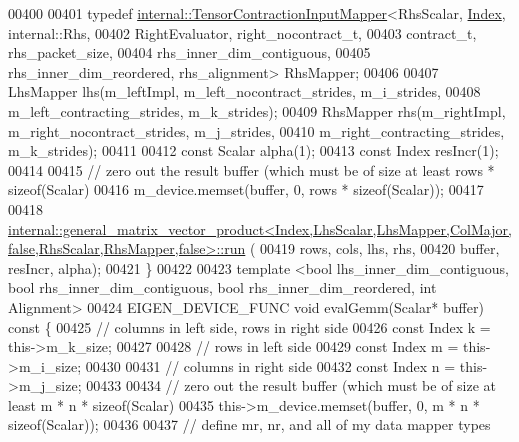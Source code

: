 \begin{DoxyCode}
00400 
00401     \textcolor{keyword}{typedef} \hyperlink{class_eigen_1_1internal_1_1_tensor_contraction_input_mapper}{internal::TensorContractionInputMapper}<RhsScalar, 
      \hyperlink{namespace_eigen_a62e77e0933482dafde8fe197d9a2cfde}{Index}, internal::Rhs,
00402                                                    RightEvaluator, right\_nocontract\_t,
00403                                                    contract\_t, rhs\_packet\_size,
00404                                                    rhs\_inner\_dim\_contiguous,
00405                                                    rhs\_inner\_dim\_reordered, rhs\_alignment> RhsMapper;
00406 
00407     LhsMapper lhs(m\_leftImpl, m\_left\_nocontract\_strides, m\_i\_strides,
00408                   m\_left\_contracting\_strides, m\_k\_strides);
00409     RhsMapper rhs(m\_rightImpl, m\_right\_nocontract\_strides, m\_j\_strides,
00410                   m\_right\_contracting\_strides, m\_k\_strides);
00411 
00412     \textcolor{keyword}{const} Scalar alpha(1);
00413     \textcolor{keyword}{const} Index resIncr(1);
00414 
00415     \textcolor{comment}{// zero out the result buffer (which must be of size at least rows * sizeof(Scalar)}
00416     m\_device.memset(buffer, 0, rows * \textcolor{keyword}{sizeof}(Scalar));
00417 
00418     
      \hyperlink{struct_eigen_1_1internal_1_1general__matrix__vector__product}{
      internal::general\_matrix\_vector\_product<Index,LhsScalar,LhsMapper,ColMajor,false,RhsScalar,RhsMapper,false>::run}
      (
00419         rows, cols, lhs, rhs,
00420         buffer, resIncr, alpha);
00421   \}
00422 
00423   \textcolor{keyword}{template} <\textcolor{keywordtype}{bool} lhs\_inner\_dim\_contiguous, \textcolor{keywordtype}{bool} rhs\_inner\_dim\_contiguous, \textcolor{keywordtype}{bool} rhs\_inner\_dim\_reordered, \textcolor{keywordtype}{int}
       Alignment>
00424   EIGEN\_DEVICE\_FUNC \textcolor{keywordtype}{void} evalGemm(Scalar* buffer)\textcolor{keyword}{ const }\{
00425     \textcolor{comment}{// columns in left side, rows in right side}
00426     \textcolor{keyword}{const} Index k = this->m\_k\_size;
00427 
00428     \textcolor{comment}{// rows in left side}
00429     \textcolor{keyword}{const} Index m = this->m\_i\_size;
00430 
00431     \textcolor{comment}{// columns in right side}
00432     \textcolor{keyword}{const} Index n = this->m\_j\_size;
00433 
00434     \textcolor{comment}{// zero out the result buffer (which must be of size at least m * n * sizeof(Scalar)}
00435     this->m\_device.memset(buffer, 0, m * n * \textcolor{keyword}{sizeof}(Scalar));
00436 
00437     \textcolor{comment}{// define mr, nr, and all of my data mapper types}

\end{DoxyCode}
